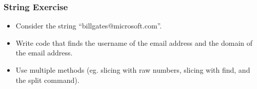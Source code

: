 



\begin{frame}[fragile]\frametitle{String Exercise}
  \begin{itemize}
  \item Consider the string ``billgates@microsoft.com''. 
\item Write code that finds the username of the email address and the domain of the email address. 
\item Use multiple methods (eg. slicing with raw numbers, slicing with find, and the split command).
  \end{itemize}
\end{frame}



